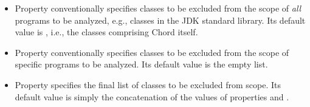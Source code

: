 \begin{itemize}
\item
Property  conventionally specifies
classes to be excluded from the scope of {\it all} programs to be
analyzed, e.g., classes in the JDK standard library.  Its default
value is , i.e., the classes comprising
Chord itself.
\item
Property  conventionally specifies
classes to be excluded from the scope of specific programs to be
analyzed.  Its default value is the empty list.
\item
Property  specifies the final list of
classes to be excluded from scope.  Its default value is simply the
concatenation of the values of properties
 and .
\end{itemize}


